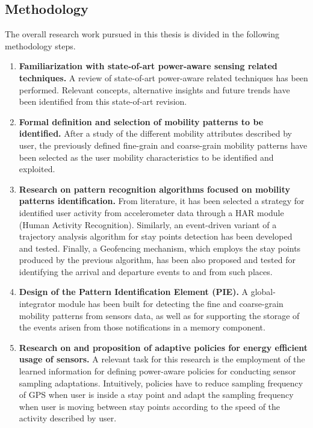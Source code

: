 \documentclass[ENG,PhD]{cinvestav}
\begin{document}
\subsection{Methodology}
The overall research work pursued in this thesis is divided in the following methodology steps.
\begin{enumerate}
  \item \textbf{Familiarization with state-of-art power-aware sensing related techniques.}
  A review of state-of-art power-aware related techniques has been performed.
  Relevant concepts, alternative insights and future trends have been identified from this state-of-art revision.
  
  \item \textbf{Formal definition and selection of mobility patterns to be identified.}
  After a study of the different mobility attributes described by user, the previously defined fine-grain and coarse-grain mobility patterns have been selected as the user mobility characteristics to be identified and exploited.

  \item \textbf{Research on pattern recognition algorithms focused on mobility patterns identification.}
  From literature, it has been selected a strategy for identified user activity from accelerometer data through a HAR module (Human Activity Recognition).%
  Similarly, an event-driven variant of a trajectory analysis algorithm for stay points detection has been developed and tested.
  Finally, a Geofencing mechanism, which employs the stay points produced by the previous algorithm, has been also proposed and tested for identifying the arrival and departure events to and from such places.
  
  \item \textbf{Design of the Pattern Identification Element (PIE).}
  A global-integrator module has been built for detecting the fine and coarse-grain mobility patterns from sensors data, as well as for supporting the storage of the events arisen from those notifications in a memory component.
  

  \item \textbf{Research on and proposition of adaptive policies for energy efficient usage of sensors.}
  A relevant task for this research is the employment of the learned information for defining power-aware policies for conducting sensor sampling adaptations.
  Intuitively, policies have to reduce sampling frequency of GPS when user is inside a stay point and adapt the sampling frequency when user is moving between stay points according to the speed of the activity described by user.
    


\end{enumerate}
\end{document}
